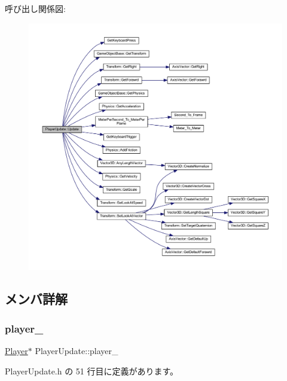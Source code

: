 呼び出し関係図\+:\nopagebreak
\begin{figure}[H]
\begin{center}
\leavevmode
\includegraphics[width=350pt]{class_player_update_af6e1b8ca60399f232e64d2acb4968c75_cgraph}
\end{center}
\end{figure}


\subsection{メンバ詳解}
\mbox{\label{class_player_update_abd75bd3c4e3ecc2863e272a5e14b677f}} 
\subsubsection{\texorpdfstring{player\+\_\+}{player\_}}
{\footnotesize\ttfamily \mbox{\hyperlink{class_player}{Player}}$\ast$ Player\+Update\+::player\+\_\+\hspace{0.3cm}{\ttfamily [private]}}



 Player\+Update.\+h の 51 行目に定義があります。

\mbox{\label{class_player_update_ade4f68ed032e187334cc2e3922e365c5}} 
